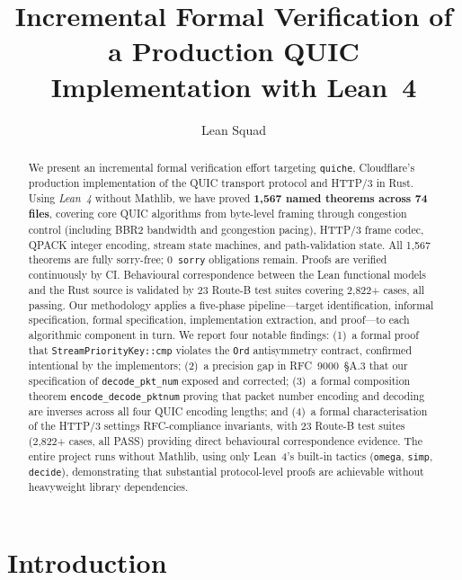 \documentclass[sigconf,10pt]{acmart}
\title{Incremental Formal Verification of a Production QUIC Implementation
       with Lean~4}
\author{Lean Squad}
\affiliation{%
  \institution{Automated Formal Verification Agent}
  \country{}}
\begin{document}
\begin{abstract}
We present an incremental formal verification effort targeting
\texttt{quiche}, Cloudflare's production implementation of the QUIC
transport protocol and HTTP/3 in Rust.
Using \emph{Lean~4} without Mathlib, we have proved
\textbf{1{,}567 named theorems across 74 files}, covering core QUIC algorithms
from byte-level framing through congestion control (including BBR2 bandwidth
and gcongestion pacing), HTTP/3 frame codec, QPACK integer encoding, stream
state machines, and path-validation state.
All 1{,}567 theorems are fully sorry-free; 0~\texttt{sorry} obligations remain.
Proofs are verified continuously by CI.
Behavioural correspondence between the Lean functional models and the Rust
source is validated by 23 Route-B test suites covering 2{,}822+ cases, all passing.
Our methodology applies a five-phase pipeline---target identification,
informal specification, formal specification, implementation extraction,
and proof---to each algorithmic component in turn.
We report four notable findings:
(1)~a formal proof that \texttt{StreamPriorityKey::cmp} violates the
    \texttt{Ord} antisymmetry contract, confirmed intentional by the
    implementors;
(2)~a precision gap in RFC~9000~\S A.3 that our specification of
    \texttt{decode\_pkt\_num} exposed and corrected;
(3)~a formal composition theorem \texttt{encode\_decode\_pktnum} proving
    that packet number encoding and decoding are inverses across all four
    QUIC encoding lengths; and
(4)~a formal characterisation of the HTTP/3 settings RFC-compliance
    invariants, with 23 Route-B test suites (2{,}822+ cases, all PASS)
    providing direct behavioural correspondence evidence.
The entire project runs without Mathlib, using only Lean~4's built-in
tactics (\texttt{omega}, \texttt{simp}, \texttt{decide}), demonstrating
that substantial protocol-level proofs are achievable without heavyweight
library dependencies.
\end{abstract}

\maketitle

\section{Introduction}
\end{document}
